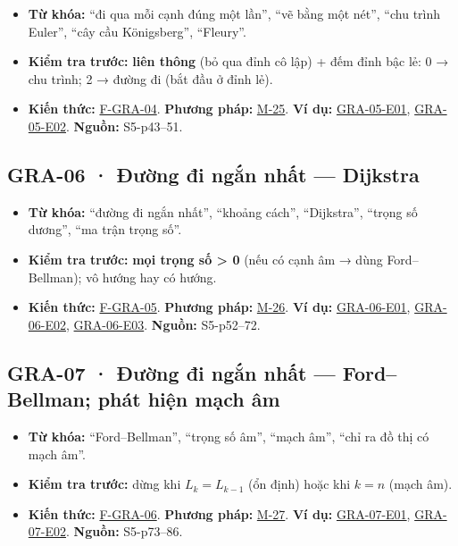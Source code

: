 \documentclass[
  10pt,
  twoside,openany]{book}
\providecommand{\tightlist}{%
  \setlength{\itemsep}{0pt}\setlength{\parskip}{0pt}}
\begin{document}
\begin{itemize}
\tightlist
\item
  \textbf{Từ khóa:} ``đi qua mỗi cạnh đúng một lần'', ``vẽ bằng một
  nét'', ``chu trình Euler'', ``cây cầu Königsberg'', ``Fleury''.
\item
  \textbf{Kiểm tra trước:} \textbf{liên thông} (bỏ qua đỉnh cô lập) +
  đếm đỉnh bậc lẻ: 0 → chu trình; 2 → đường đi (bắt đầu ở đỉnh lẻ).
\item
  \textbf{Kiến thức:} \protect\hyperlink{F-GRA-04}{F-GRA-04}.
  \textbf{Phương pháp:} \protect\hyperlink{M-25}{M-25}. \textbf{Ví dụ:}
  \protect\hyperlink{GRA-05-E01}{GRA-05-E01},
  \protect\hyperlink{GRA-05-E02}{GRA-05-E02}. \textbf{Nguồn:}
  S5-p43--51.
\end{itemize}

\hypertarget{GRA-06}{%
\subsection{GRA-06 · Đường đi ngắn nhất --- Dijkstra}\label{GRA-06}}

\begin{itemize}
\tightlist
\item
  \textbf{Từ khóa:} ``đường đi ngắn nhất'', ``khoảng cách'',
  ``Dijkstra'', ``trọng số dương'', ``ma trận trọng số''.
\item
  \textbf{Kiểm tra trước:} \textbf{mọi trọng số \textgreater{} 0} (nếu
  có cạnh âm → dùng Ford--Bellman); vô hướng hay có hướng.
\item
  \textbf{Kiến thức:} \protect\hyperlink{F-GRA-05}{F-GRA-05}.
  \textbf{Phương pháp:} \protect\hyperlink{M-26}{M-26}. \textbf{Ví dụ:}
  \protect\hyperlink{GRA-06-E01}{GRA-06-E01},
  \protect\hyperlink{GRA-06-E02}{GRA-06-E02},
  \protect\hyperlink{GRA-06-E03}{GRA-06-E03}. \textbf{Nguồn:}
  S5-p52--72.
\end{itemize}

\hypertarget{GRA-07}{%
\subsection{GRA-07 · Đường đi ngắn nhất --- Ford--Bellman; phát hiện
mạch âm}\label{GRA-07}}

\begin{itemize}
\tightlist
\item
  \textbf{Từ khóa:} ``Ford--Bellman'', ``trọng số âm'', ``mạch âm'',
  ``chỉ ra đồ thị có mạch âm''.
\item
  \textbf{Kiểm tra trước:} dừng khi \(L_k=L_{k-1}\) (ổn định) hoặc khi
  \(k=n\) (mạch âm).
\item
  \textbf{Kiến thức:} \protect\hyperlink{F-GRA-06}{F-GRA-06}.
  \textbf{Phương pháp:} \protect\hyperlink{M-27}{M-27}. \textbf{Ví dụ:}
  \protect\hyperlink{GRA-07-E01}{GRA-07-E01},
  \protect\hyperlink{GRA-07-E02}{GRA-07-E02}. \textbf{Nguồn:}
  S5-p73--86.
\end{itemize}
\end{document}
